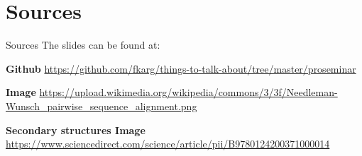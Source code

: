 
\section{Sources}

\begin{frame}{Sources}
    The slides can be found at: \newline \newline

    \beamertemplatearticlebibitems
    \begin{thebibliography}{10}

        {\bf Github}
        \newblock \url{https://github.com/fkarg/things-to-talk-about/tree/master/proseminar}
    \newline

            {\bf Image}
            \newblock \url{https://upload.wikimedia.org/wikipedia/commons/3/3f/Needleman-Wunsch_pairwise_sequence_alignment.png}

            {\bf Secondary structures Image}
            \newblock \url{https://www.sciencedirect.com/science/article/pii/B9780124200371000014}

% 
% 
% 
   \end{thebibliography}

\end{frame}




